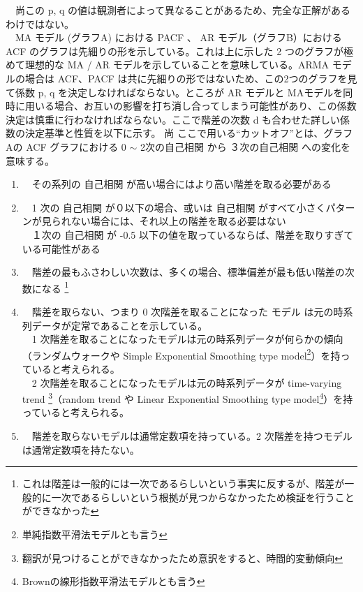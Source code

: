 \documentclass{scrartcl}
\begin{document}
　尚この p, q の値は観測者によって異なることがあるため、完全な正解があるわけではない。\\
　MA モデル (グラフA) における PACF 、 AR モデル（グラフB）における ACF のグラフは先細りの形を示している。これは上に示した 2 つのグラフが極めて理想的な MA / AR モデルを示していることを意味している。ARMA モデルの場合は ACF、PACF は共に先細りの形ではないため、この2つのグラフを見て係数 p, q を決定しなければならない。ところが AR モデルと MAモデルを同時に用いる場合、お互いの影響を打ち消し合ってしまう可能性があり、この係数決定は慎重に行わなければならない。ここで階差の次数 d も合わせた詳しい係数の決定基準と性質を以下に示す。\cite{acf-pacf} 尚 ここで用いる``カットオフ''とは、グラフAの ACF グラフにおける 0 \(\sim\) 2次の自己相関 から ３次の自己相関 への変化を意味する。\\
\begin{enumerate}
\item 　その系列の 自己相関 が高い場合にはより高い階差を取る必要がある\\
\item 　1 次の 自己相関 が０以下の場合、或いは 自己相関 がすべて小さくパターンが見られない場合には、それ以上の階差を取る必要はない\\
　１次の 自己相関 が -0.5 以下の値を取っているならば、階差を取りすぎている可能性がある\\
\item 　階差の最もふさわしい次数は、多くの場合、標準偏差が最も低い階差の次数になる \footnote{これは階差は一般的には一次であるらしいという事実に反するが、階差が一般的に一次であるらしいという根拠が見つからなかったため検証を行うことができなかった}\\
\item 　階差を取らない、つまり 0 次階差を取ることになった モデル は元の時系列データが定常であることを示している。\\
　1 次階差を取ることになったモデルは元の時系列データが何らかの傾向（ランダムウォークや Simple Exponential Smoothing type model\footnote{単純指数平滑法モデルとも言う}）を持っていると考えられる。\\
　2 次階差を取ることになったモデルは元の時系列データが time-varying trend \footnote{翻訳が見つけることができなかったため意訳をすると、時間的変動傾向}（random trend や Linear Exponential Smoothing type model\footnote{Brownの線形指数平滑法モデルとも言う}）を持っていると考えられる。\\
\item 　階差を取らないモデルは通常定数項を持っている。2 次階差を持つモデルは通常定数項を持たない。\\

\end{enumerate}
\end{document}
